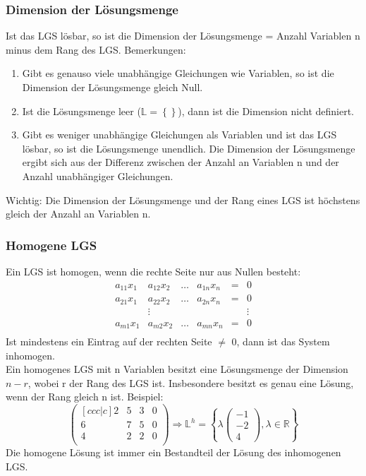 \documentclass[10pt]{scrartcl}
\begin{document}
\begin{multicols}{2}
\subsubsection*{Dimension der Lösungsmenge}
Ist das LGS lösbar, so ist die Dimension der Lösungsmenge = Anzahl Variablen n minus dem Rang des LGS. Bemerkungen:
\begin{enumerate}
\item Gibt es genauso viele unabhängige Gleichungen wie Variablen, so ist die Dimension der Lösungsmenge gleich Null.
\item Ist die Lösungsmenge leer ($\mathbb{L}=\left\lbrace \right \rbrace $), dann ist die Dimension nicht definiert.
\item Gibt es weniger unabhängige Gleichungen als Variablen und ist das LGS lösbar, so ist die Lösungsmenge unendlich. Die Dimension der Lösungsmenge ergibt sich aus der Differenz zwischen der Anzahl an Variablen n und der Anzahl unabhängiger Gleichungen.
\end{enumerate}
Wichtig: Die Dimension der Lösungsmenge und der
Rang eines LGS ist höchstens gleich der Anzahl an Variablen n.
\subsubsection*{Homogene LGS}
Ein LGS ist homogen, wenn die rechte Seite nur aus Nullen besteht:
\begin{equation}
\begin{matrix}
a_{11}x_{1} & a_{12}x_{2} & \dots & a_{1n}x_{n} & = & 0 \\
a_{21}x_{1} & a_{22}x_{2} & \dots & a_{2n}x_{n} & = & 0 \\
& \vdots &&&& \vdots\\
a_{m1}x_{1} & a_{m2}x_{2} & \dots & a_{mn}x_{n} & = & 0 \\
\end{matrix}
\end{equation}
Ist mindestens ein Eintrag auf der rechten Seite $\neq$ 0, dann ist das System inhomogen.\\
Ein homogenes LGS mit n Variablen besitzt eine Lösungsmenge der Dimension $n - r$, wobei r der Rang des LGS ist. Insbesondere besitzt es genau eine Lösung, wenn der Rang gleich n ist. Beispiel:\\
\begin{equation}
\begin{pmatrix}[ccc|c]
2 & 5 & 3 & 0 \\
6 & 7 & 5 & 0 \\
4 & 2 & 2 & 0 \\
\end{pmatrix} \Rightarrow \mathbb{L}^h=\left\lbrace \lambda\left( \begin{matrix} -1 \\ -2 \\ 4 \end{matrix}\right), \lambda \in \mathbb{R}  \right \rbrace 
\end{equation}
Die homogene Lösung ist immer ein Bestandteil der Lösung des inhomogenen LGS.

\end{multicols}
\end{document}
